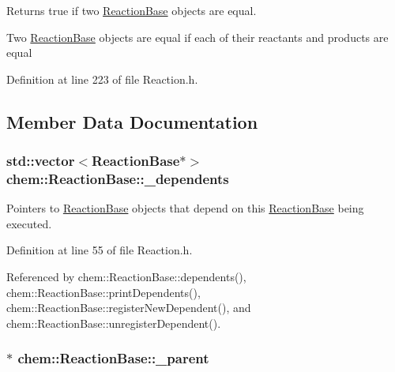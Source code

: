 Returns true if two \hyperlink{classchem_1_1ReactionBase}{Reaction\-Base} objects are equal. 

Two \hyperlink{classchem_1_1ReactionBase}{Reaction\-Base} objects are equal if each of their reactants and products are equal 

Definition at line 223 of file Reaction.\-h.



\subsection{Member Data Documentation}
\hypertarget{classchem_1_1ReactionBase_a04cda0098d19b2b4a68a6c413c97ed96}{
\subsubsection[{\-\_\-dependents}]{\setlength{\rightskip}{0pt plus 5cm}std\-::vector$<${\bf Reaction\-Base}$\ast$$>$ {\bf chem\-::\-Reaction\-Base\-::\-\_\-dependents}}}\label{classchem_1_1ReactionBase_a04cda0098d19b2b4a68a6c413c97ed96}


Pointers to \hyperlink{classchem_1_1ReactionBase}{Reaction\-Base} objects that depend on this \hyperlink{classchem_1_1ReactionBase}{Reaction\-Base} being executed. 



Definition at line 55 of file Reaction.\-h.



Referenced by chem\-::\-Reaction\-Base\-::dependents(), chem\-::\-Reaction\-Base\-::print\-Dependents(), chem\-::\-Reaction\-Base\-::register\-New\-Dependent(), and chem\-::\-Reaction\-Base\-::unregister\-Dependent().

\hypertarget{classchem_1_1ReactionBase_a662547106ad4d617495099e9fd85cc06}{
\subsubsection[{\-\_\-parent}]{$\ast$ {\bf chem\-::\-Reaction\-Base\-::\-\_\-parent}}}\label{classchem_1_1ReactionBase_a662547106ad4d617495099e9fd85cc06}


